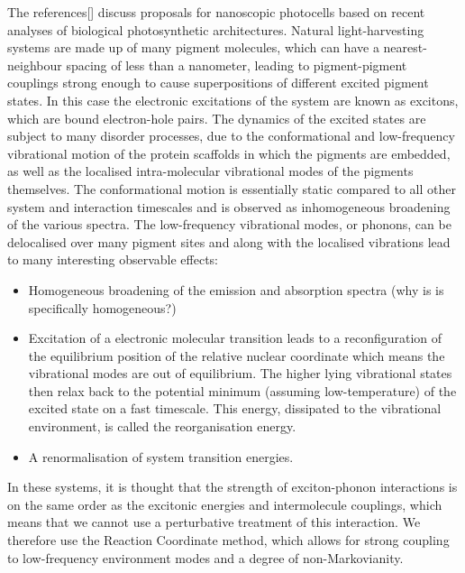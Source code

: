 \documentclass[]{article}
\begin{document}
The references[]  discuss proposals for nanoscopic photocells based on recent analyses of biological photosynthetic architectures. Natural light-harvesting systems are made up of many pigment molecules, which can have a nearest-neighbour spacing of less than a nanometer\cite{}, leading to pigment-pigment couplings strong enough to cause superpositions of different excited pigment states. In this case the electronic excitations of the system are known as excitons, which are bound electron-hole pairs. The dynamics of the excited states are subject to many disorder processes, due to the conformational and low-frequency vibrational motion of the protein scaffolds in which the pigments are embedded, as well as the localised intra-molecular vibrational modes of the pigments themselves\cite{}. The conformational motion is essentially static compared to all other system and interaction timescales and is observed as inhomogeneous broadening of the various spectra. The low-frequency vibrational modes, or phonons, can be delocalised over many pigment sites and along with the localised vibrations lead to many interesting observable effects:
\begin{itemize}
	\item Homogeneous broadening of the emission and absorption spectra (why is is specifically homogeneous?)
	\item Excitation of a electronic molecular transition leads to a reconfiguration of the equilibrium position of the relative nuclear coordinate which means the vibrational modes are out of equilibrium. The higher lying vibrational states then relax back to the potential minimum (assuming low-temperature) of the excited state on a fast timescale. This energy, dissipated to the vibrational environment, is called the reorganisation energy.
	\item A renormalisation of system transition energies.
\end{itemize}

 In these systems, it is thought that the strength of exciton-phonon interactions is on the same order as the excitonic energies and intermolecule couplings, which means that we cannot use a perturbative treatment of this interaction. We therefore use the Reaction Coordinate method, which allows for strong coupling to low-frequency environment modes and a degree of non-Markovianity. 
\\ 

\end{document}
